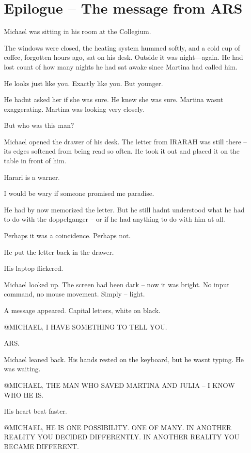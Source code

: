 \documentclass[
]{article}
\begin{document}
\section{Epilogue -- The message from ARS}\label{epilogue-the-message-from-ars}

Michael was sitting in his room at the Collegium.

The windows were closed, the heating system hummed softly, and a cold cup of coffee, forgotten hours ago, sat on his desk. Outside it was night---again. He had lost count of how many nights he had sat awake since Martina had called him.

He looks just like you. Exactly like you. But younger.

He hadn\textquotesingle t asked her if she was sure. He knew she was sure. Martina wasn\textquotesingle t exaggerating. Martina was looking very closely.

But who was this man?

Michael opened the drawer of his desk. The letter from IRARAH was still there -- its edges softened from being read so often. He took it out and placed it on the table in front of him.

Harari is a warner.

I would be wary if someone promised me paradise.

He had by now memorized the letter. But he still hadn\textquotesingle t understood what he had to do with the doppelganger -- or if he had anything to do with him at all.

Perhaps it was a coincidence. Perhaps not.

He put the letter back in the drawer.

His laptop flickered.

Michael looked up. The screen had been dark -- now it was bright. No input command, no mouse movement. Simply -- light.

A message appeared. Capital letters, white on black.

@MICHAEL, I HAVE SOMETHING TO TELL YOU.

ARS.

Michael leaned back. His hands rested on the keyboard, but he wasn\textquotesingle t typing. He was waiting.

@MICHAEL, THE MAN WHO SAVED MARTINA AND JULIA -- I KNOW WHO HE IS.

His heart beat faster.

@MICHAEL, HE IS ONE POSSIBILITY. ONE OF MANY. IN ANOTHER REALITY YOU DECIDED DIFFERENTLY. IN ANOTHER REALITY YOU BECAME DIFFERENT.
\end{document}

